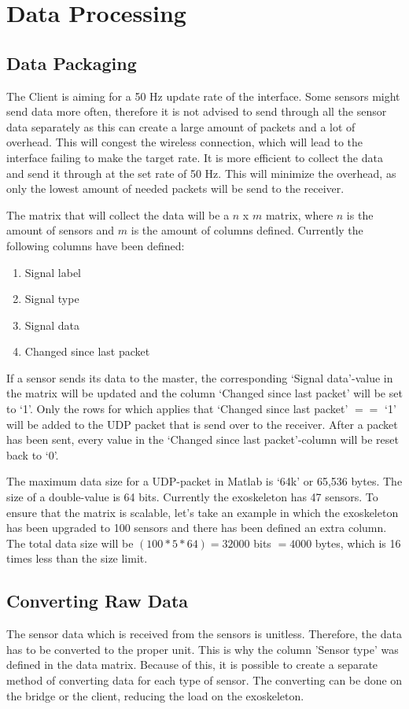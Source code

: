 \section{Data Processing}\label{sec:dataproc}
\subsection{Data Packaging}
The Client is aiming for a 50 Hz update rate of the interface. Some sensors might send data more often, therefore it is not advised to send through all the sensor data separately as this can create a large amount of packets and a lot of overhead. This will congest the wireless connection, which will lead to the interface failing to make the target rate. It is more efficient to collect the data and send it through at the set rate of 50 Hz. This will minimize the overhead, as only the lowest amount of needed packets will be send to the receiver.

The matrix that will collect the data will be a $n$ x $m$ matrix, where $n$ is the amount of sensors and $m$ is the amount of columns defined. Currently the following columns have been defined:\\
\begin{enumerate}
	\item Signal label
	\item Signal type
	\item Signal data
	\item Changed since last packet
\end{enumerate}
If a sensor sends its data to the master, the corresponding `Signal data'-value in the matrix will be updated and the column `Changed since last packet' will be set to `1'. Only the rows for which applies that `Changed since last packet' $==$ `1' will be added to the UDP packet that is send over to the receiver. After a packet has been sent, every value in the `Changed since last packet'-column will be reset back to `0'.

The maximum data size for a UDP-packet in Matlab is `64k' or 65,536 bytes. The size of a double-value is 64 bits. Currently the exoskeleton has 47 sensors. To ensure that the matrix is scalable, let's take an example in which the exoskeleton has been upgraded to 100 sensors and there has been defined an extra column. The total data size will be $(100*5*64) = 32000$ bits $= 4000$ bytes, which is 16 times less than the size limit. 

\subsection{Converting Raw Data}
The sensor data which is received from the sensors is unitless. Therefore, the data has to be converted to the proper unit. This is why the column 'Sensor type' was defined in the data matrix. Because of this, it is possible to create a separate method of converting data for each type of sensor. The converting can be done on the bridge or the client,  reducing the load on the exoskeleton.